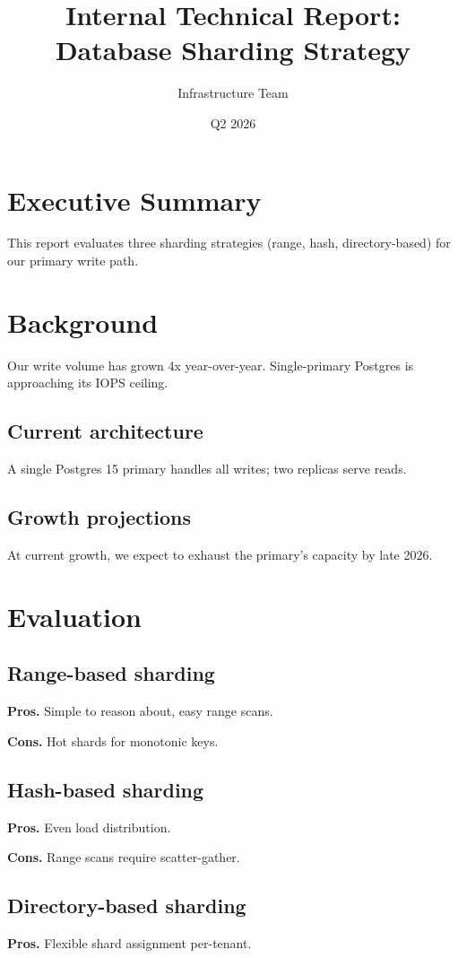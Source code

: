 \documentclass{report}
\title{Internal Technical Report: Database Sharding Strategy}
\author{Infrastructure Team}
\date{Q2 2026}
\begin{document}
\maketitle

\tableofcontents

\chapter{Executive Summary}
This report evaluates three sharding strategies (range, hash, directory-based) for our primary write path.

\chapter{Background}
Our write volume has grown 4x year-over-year. Single-primary Postgres is approaching its IOPS ceiling.

\section{Current architecture}
A single Postgres 15 primary handles all writes; two replicas serve reads.

\section{Growth projections}
At current growth, we expect to exhaust the primary's capacity by late 2026.

\chapter{Evaluation}

\section{Range-based sharding}
\textbf{Pros.} Simple to reason about, easy range scans.

\textbf{Cons.} Hot shards for monotonic keys.

\section{Hash-based sharding}
\textbf{Pros.} Even load distribution.

\textbf{Cons.} Range scans require scatter-gather.

\section{Directory-based sharding}
\textbf{Pros.} Flexible shard assignment per-tenant.
\end{document}
